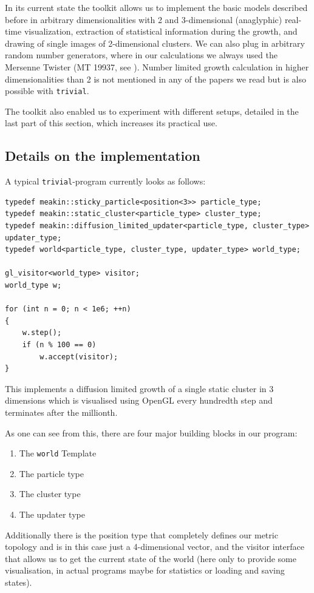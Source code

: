 \documentclass[twocolumn,10pt]{scrartcl}
\begin{document}
        In its current state the toolkit allows us to implement the basic models described before in arbitrary
        dimensionalities with 2 and 3-dimensional (anaglyphic) real-time visualization, extraction of statistical
        information during the growth, and drawing of single images of 2-dimensional clusters. We can also plug in
        arbitrary random number generators, where in our calculations we always used the Mersenne Twister (MT 19937, see
        \cite{src-matsumoto}).  Number limited growth calculation in higher dimensionalities than 2 is not mentioned in
        any of the papers we read but is also possible with \lstinline'trivial'.

        The toolkit also enabled us to experiment with different setups, detailed in the last part of this section,
        which increases its practical use.

        \subsection{Details on the implementation}
            A typical \lstinline'trivial'-program currently looks as follows:
            \begin{lstlisting}
typedef meakin::sticky_particle<position<3>> particle_type;
typedef meakin::static_cluster<particle_type> cluster_type;
typedef meakin::diffusion_limited_updater<particle_type, cluster_type> updater_type;
typedef world<particle_type, cluster_type, updater_type> world_type;

gl_visitor<world_type> visitor;
world_type w;

for (int n = 0; n < 1e6; ++n)
{
    w.step();
    if (n % 100 == 0)
        w.accept(visitor);
}
            \end{lstlisting}
            This implements a diffusion limited growth of a single static cluster in 3 dimensions which is visualised
            using OpenGL every hundredth step and terminates after the millionth.

            As one can see from this, there are four major building blocks in our program:
            \begin{enumerate}
                \item The \lstinline'world' Template
                \item The particle type
                \item The cluster type
                \item The updater type
            \end{enumerate}
            Additionally there is the position type that completely defines our metric topology and is in this case just
            a 4-dimensional vector, and the visitor interface that allows us to get the current state of the world (here
            only to provide some visualisation, in actual programs maybe for statistics or loading and saving states).
\end{document}
